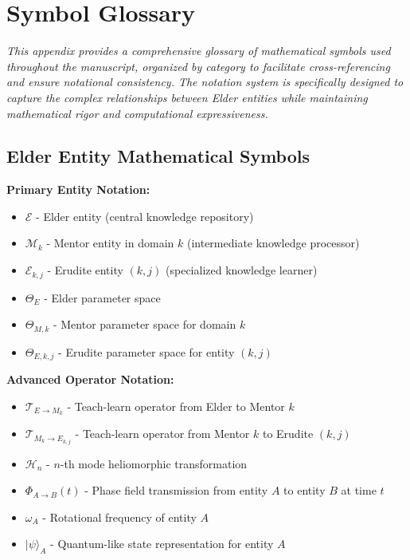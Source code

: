 \chapter{Symbol Glossary}

\textit{This appendix provides a comprehensive glossary of mathematical symbols used throughout the manuscript, organized by category to facilitate cross-referencing and ensure notational consistency. The notation system is specifically designed to capture the complex relationships between Elder entities while maintaining mathematical rigor and computational expressiveness.}

\section{Elder Entity Mathematical Symbols}

\textbf{Primary Entity Notation:}
\begin{itemize}
    \item $\mathcal{E}$ - Elder entity (central knowledge repository)
    \item $\mathcal{M}_k$ - Mentor entity in domain $k$ (intermediate knowledge processor)  
    \item $\mathcal{E}_{k,j}$ - Erudite entity $(k,j)$ (specialized knowledge learner)
    \item $\Theta_E$ - Elder parameter space
    \item $\Theta_{M,k}$ - Mentor parameter space for domain $k$
    \item $\Theta_{E,k,j}$ - Erudite parameter space for entity $(k,j)$
\end{itemize}

\textbf{Advanced Operator Notation:}
\begin{itemize}
    \item $\mathcal{T}_{E \rightarrow M_k}$ - Teach-learn operator from Elder to Mentor $k$
    \item $\mathcal{T}_{M_k \rightarrow E_{k,j}}$ - Teach-learn operator from Mentor $k$ to Erudite $(k,j)$
    \item $\mathcal{H}_n$ - $n$-th mode heliomorphic transformation
    \item $\Phi_{A \rightarrow B}(t)$ - Phase field transmission from entity $A$ to entity $B$ at time $t$
    \item $\omega_A$ - Rotational frequency of entity $A$
    \item $|\psi\rangle_{A}$ - Quantum-like state representation for entity $A$
\end{itemize}

